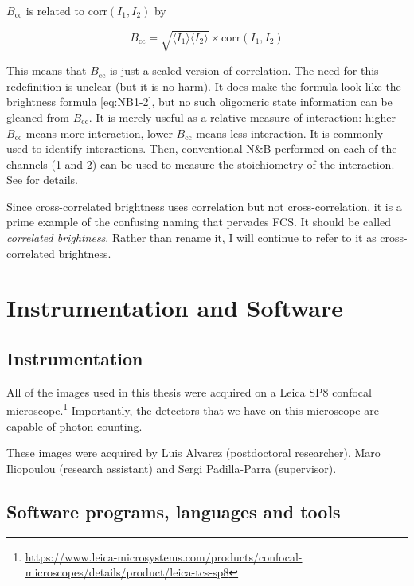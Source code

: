 \documentclass[12pt,]{book}
\let\rmarkdownfootnote\footnote%
\def\footnote{\protect\rmarkdownfootnote}
\theoremstyle{definition}
\theoremstyle{definition}
\theoremstyle{definition}
\theoremstyle{remark}
\let\BeginKnitrBlock\begin \let\EndKnitrBlock\end
\begin{document}
\(B_\text{cc}\) is related to \(\text{corr}(I_1, I_2)\) by

\begin{equation}
B_\text{cc} = \sqrt{\langle I_1 \rangle \langle I_2 \rangle} \times \text{corr}(I_1, I_2)
\label{eq:bcc-corr}
\end{equation}

This means that \(B_\text{cc}\) is just a scaled version of correlation.
The need for this redefinition is unclear (but it is no harm). It does
make the formula look like the brightness formula \eqref{eq:NB1-2}, but no
such oligomeric state information can be gleaned from \(B_\text{cc}\).
It is merely useful as a relative measure of interaction: higher
\(B_\text{cc}\) means more interaction, lower \(B_\text{cc}\) means less
interaction. It is commonly used to identify interactions. Then,
conventional N\&B performed on each of the channels (1 and 2) can be
used to measure the stoichiometry of the interaction. See \citet{ccNB}
for details.

\BeginKnitrBlock{remark}
\iffalse{} {Remark. } \fi{}Since cross-correlated brightness uses
correlation but not cross-correlation, it is a prime example of the
confusing naming that pervades FCS. It should be called \emph{correlated
brightness}. Rather than rename it, I will continue to refer to it as
cross-correlated brightness.
\EndKnitrBlock{remark}

\chapter{Instrumentation and
Software}\label{instrumentation-and-software}

\section{Instrumentation}\label{instrumentation}

All of the images used in this thesis were acquired on a Leica SP8
confocal microscope.\footnote{\url{https://www.leica-microsystems.com/products/confocal-microscopes/details/product/leica-tcs-sp8}}
Importantly, the detectors that we have on this microscope are capable
of photon counting.

These images were acquired by Luis Alvarez (postdoctoral researcher),
Maro Iliopoulou (research assistant) and Sergi Padilla-Parra
(supervisor).

\section{Software programs, languages and
tools}\label{software-programs-languages-and-tools}
\end{document}
